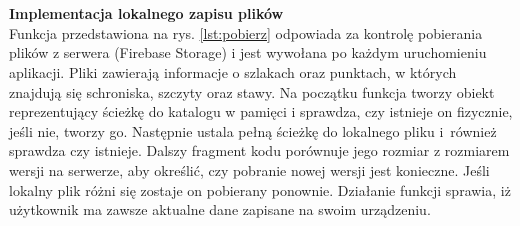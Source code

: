 \noindent
\begin{minipage}{\linewidth}
    \label{lst:rysowanie}
    \centering
\end{minipage}\\
\\


\noindent \textbf{Implementacja lokalnego zapisu plików} \\ 
\indent Funkcja przedstawiona na rys. \ref{lst:pobierz} odpowiada za kontrolę pobierania plików z serwera (Firebase Storage) i jest wywołana po każdym uruchomieniu aplikacji. Pliki zawierają informacje o szlakach oraz punktach, w których znajdują się schroniska, szczyty oraz stawy. Na początku funkcja tworzy obiekt reprezentujący ścieżkę do katalogu w pamięci i sprawdza, czy istnieje on fizycznie, jeśli nie, tworzy go. Następnie ustala pełną ścieżkę do lokalnego pliku i~również sprawdza czy istnieje. Dalszy fragment kodu porównuje jego rozmiar z rozmiarem wersji na serwerze, aby określić, czy pobranie nowej wersji jest konieczne. Jeśli lokalny plik różni się zostaje on pobierany ponownie. Działanie funkcji sprawia, iż użytkownik ma zawsze aktualne dane zapisane na swoim urządzeniu. 
\\

